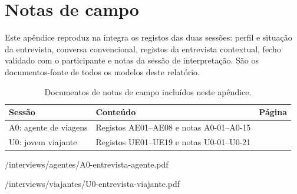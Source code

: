 \section{Notas de campo}\label{anx:notas}

Este apêndice reproduz na íntegra os registos das duas sessões: perfil e situação da entrevista, conversa convencional, registos da entrevista contextual, fecho validado com o participante e notas da sessão de interpretação. São os documentos-fonte de todos os modelos deste relatório.

\begin{table}[!htbp]
\centering\small
\begin{tabularx}{\textwidth}{@{}p{3cm}Lp{2.6cm}@{}}
\toprule
\textbf{Sessão} & \textbf{Conteúdo} & \textbf{Página} \\
\midrule
A0: agente de viagens & Registos AE01--AE08 e notas A0-01--A0-15 & \pageref{anx:notas-a0} \\
U0: jovem viajante & Registos UE01--UE19 e notas U0-01--U0-21 & \pageref{anx:notas-u0} \\
\bottomrule
\end{tabularx}
\caption{Documentos de notas de campo incluídos neste apêndice.}
\label{tab:notas-campo}
\end{table}


  {\wm/interviews/agentes/A0-entrevista-agente.pdf}


  {\wm/interviews/viajantes/U0-entrevista-viajante.pdf}
